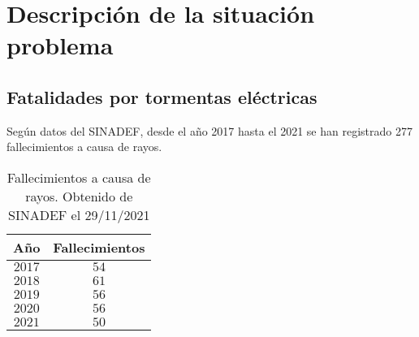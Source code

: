 \section{Descripción de la situación problema}

\subsection{Fatalidades por tormentas eléctricas}

Según datos del SINADEF, desde el año 2017 hasta el 2021 se han registrado 277 
fallecimientos a causa de rayos.

\begin{table}[h]
  \centering
  \label{tab:fallecimientos_rayo}
  \caption[Fallecimientos a causa de rayos 2017-2021]{
    Fallecimientos a causa de rayos. Obtenido de SINADEF el 29/11/2021
    }
  \begin{tabular}{cc}
    Año & Fallecimientos\\
    \hline
    $2017$ & $54$\\
    $2018$ & $61$\\
    $2019$ & $56$\\
    $2020$ & $56$\\
    $2021$ & $50$\\
    \end{tabular}
\end{table}


